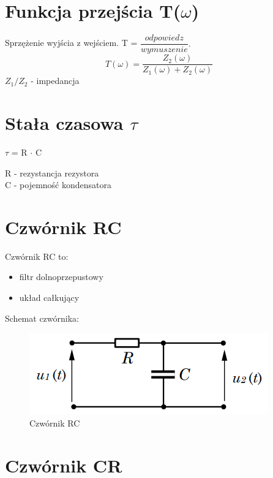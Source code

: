 \section{Funkcja przejścia T($\omega$)}

Sprzężenie wyjścia z wejściem. T = $\dfrac{odpowiedz}{wymuszenie}.$ \\

\begin{equation}
T(\omega) = \frac{Z_2(\omega)}{Z_1(\omega)+Z_2(\omega)}
\end{equation}
$Z_1/Z_2$ - impedancja

\section{Stała czasowa $\tau$}

\begin{center} $\tau$ = R $\cdot$ C \end{center}
R - rezystancja rezystora \\
C - pojemność kondensatora \\

\section{Czwórnik RC}

Czwórnik RC to:
\begin{itemize}
    \item filtr dolnoprzepustowy
    \item układ całkujący
\end{itemize}

Schemat czwórnika:

\begin{figure}[H]
    \centering
    \includegraphics[scale=0.75]{img_wyklad/RC.png}
    \caption{Czwórnik RC}
    \label{fig:RC}
\end{figure}

\section{Czwórnik CR}


